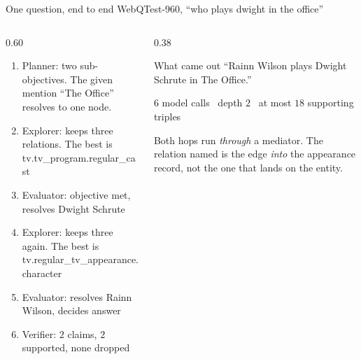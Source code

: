 \begin{frame}{One question, end to end}
  \bodyshift{-0.75pt}
  \small
  \textsf{WebQTest-960}, ``who plays dwight in the office''
  \vspace{1mm}
  \begin{columns}[T]
    \begin{column}{0.60\textwidth}
      \let\raggedright\agrraggedright
      \begin{enumerate}\setlength{\itemsep}{0pt}
        \item \alert{Planner}: two sub-objectives. The given mention
          ``The Office'' resolves to one node.
        \item \alert{Explorer}: keeps three relations. The best is\\
          \textsf{tv.tv\_program.regular\_cast}
        \item \alert{Evaluator}: objective met, resolves
          \textsf{Dwight Schrute}
        \item \alert{Explorer}: keeps three again. The best is\\
          \textsf{tv.regular\_tv\_appearance.character}
        \item \alert{Evaluator}: resolves \textsf{Rainn Wilson}, decides
          \textsf{answer}
        \item \alert{Verifier}: $2$ claims, $2$ supported, none dropped
      \end{enumerate}
    \end{column}
    \begin{column}{0.38\textwidth}
      \begin{block}{What came out}
        \small\agrraggedright
        ``Rainn Wilson plays Dwight Schrute in The Office.''
        \smallskip

        $6$ model calls \textperiodcentered\ depth $2$ \textperiodcentered\
        at most $18$ supporting triples
      \end{block}
      \vspace{1mm}
      {\small\agrraggedright \alert{Both} hops run \emph{through} a
      mediator. The relation named is the edge \emph{into} the appearance
      record, not the one that lands on the entity.\par}
    \end{column}
  \end{columns}
  \centrebody
\end{frame}

